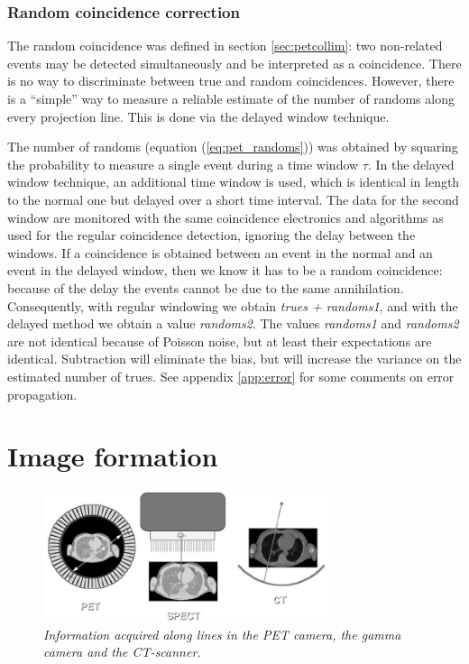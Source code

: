 \documentclass[11pt,oneside]{article}
\begin{document}
\subsubsection{Random coincidence correction} \label{sec:randoms}
The random coincidence was defined in section \ref{sec:petcollim}: two
non-related events may be detected simultaneously and be interpreted as a
coincidence. There is no way to discriminate between true and random
coincidences. However, there is a ``simple'' way to measure a reliable
estimate of the number of randoms along every projection line. This is done
via the delayed window technique.

The number of randoms (equation (\ref{eq:pet_randoms})) was obtained by
squaring the probability to measure a single event during a time window
$\tau$. In the delayed window technique, an additional time window is used,
which is identical in length to the normal one but delayed over a short time
interval. The data for the second window are monitored with the same
coincidence electronics and algorithms as used for the regular coincidence
detection, ignoring the delay between the windows. If a coincidence is
obtained between an event in the normal and an event in the delayed window,
then we know it has to be a random coincidence: because of the delay the
events cannot be due to the same annihilation. Consequently, with regular
windowing we obtain {\em trues + randoms1}, and with the delayed method we
obtain a value {\em randoms2}. The values {\em randoms1} and {\em randoms2}
are not identical because of Poisson noise, but at least their expectations
are identical. Subtraction will eliminate the bias, but will increase the
variance on the estimated number of trues. See appendix \ref{app:error} for
some comments on error propagation.

\section{Image formation} \label{ch:image_formation}

%
%
%
\begin{figure}[tb]
\centering
\includegraphics[width=0.75\textwidth]{figs/fig_spect_pet_ct.pdf}
\caption{\label{fig:spect_pet_ct_bis} \emph{Information acquired along lines
in the PET camera, the gamma camera and the CT-scanner.}}
\end{figure}
\end{document}
